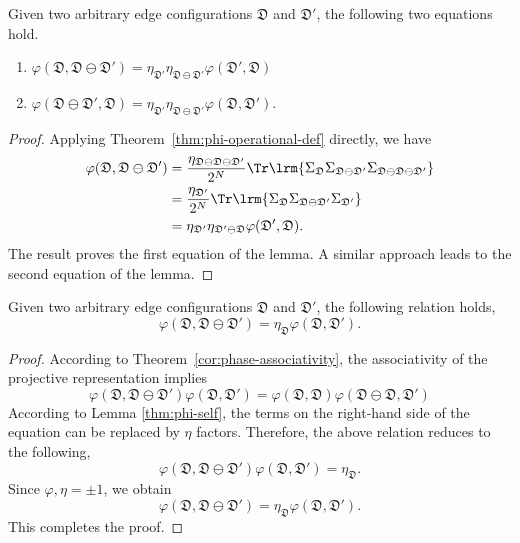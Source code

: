 \begin{lemma}\label{g-reduce-theorem.thm}
Given two arbitrary edge configurations $\mathfrak{D}$ and $\mathfrak{D}'$, the following two equations hold.
\begin{enumerate}
    \item [(i)] $\varphi(\mathfrak{D},\mathfrak{D}\ominus\mathfrak{D}') = \eta_{\mathfrak{D}'}\eta_{\mathfrak{D}\ominus\mathfrak{D}'} \varphi(\mathfrak{D}',\mathfrak{D})$
    \item [(ii)] $\varphi(\mathfrak{D}\ominus\mathfrak{D}',\mathfrak{D}) = \eta_{\mathfrak{D}'}\eta_{\mathfrak{D}\ominus\mathfrak{D}'} \varphi(\mathfrak{D},\mathfrak{D}')$.
\end{enumerate}
\end{lemma}
\begin{proof}
Applying Theorem~\ref{thm:phi-operational-def} directly, we have
  \begin{align*}
    \varphi(\mathfrak{D},\mathfrak{D}\ominus\mathfrak{D}') &= \frac{\eta_{\mathfrak{D}\ominus\mathfrak{D}\ominus\mathfrak{D}'}}{2^{N}}\Tr\lrm{\Sigma_{\mathfrak{D}}\Sigma_{\mathfrak{D}\ominus\mathfrak{D}'}\Sigma_{\mathfrak{D}\ominus\mathfrak{D}\ominus\mathfrak{D}'}} \\
    &= \frac{\eta_{\mathfrak{D}'}}{2^{N}}\Tr\lrm{\Sigma_{\mathfrak{D}}\Sigma_{\mathfrak{D}\ominus\mathfrak{D}'}\Sigma_{\mathfrak{D}'}} \\
    &=\eta_{\mathfrak{D}'}\eta_{\mathfrak{D}'\ominus\mathfrak{D}} \varphi(\mathfrak{D}',\mathfrak{D}).
  \end{align*}
The result proves the first equation of the lemma. A similar approach leads to the second equation of the lemma.
\end{proof}
\begin{lemma}\label{g_reduce_symmetric.e}
Given two arbitrary edge configurations $\mathfrak{D}$ and $\mathfrak{D}'$, the following relation holds,
  \[
  \varphi(\mathfrak{D}, \mathfrak{D}\ominus\mathfrak{D}') = \eta_{\mathfrak{D}}\varphi(\mathfrak{D},\mathfrak{D}').
  \]
\end{lemma}
\begin{proof}
  According to Theorem~\ref{cor:phase-associativity}, the associativity of the projective representation implies
  \[
  \varphi(\mathfrak{D},\mathfrak{D}\ominus\mathfrak{D}')\varphi(\mathfrak{D},\mathfrak{D}') = \varphi(\mathfrak{D},\mathfrak{D})\varphi(\mathfrak{D}\ominus\mathfrak{D},\mathfrak{D}')
  \]
  According to Lemma \ref{thm:phi-self}, the terms on the right-hand side of the equation can be replaced by $\eta$ factors. Therefore, the above relation reduces to the following,
  \[
  \varphi(\mathfrak{D},\mathfrak{D}\ominus\mathfrak{D}')\varphi(\mathfrak{D},\mathfrak{D}') = \eta_{\mathfrak{D}}.
  \]
  Since $\varphi,\eta = \pm 1$, we obtain
  \[
  \varphi(\mathfrak{D},\mathfrak{D}\ominus\mathfrak{D}') = \eta_{\mathfrak{D}}\varphi(\mathfrak{D},\mathfrak{D}').
  \]
  This completes the proof.
\end{proof}

